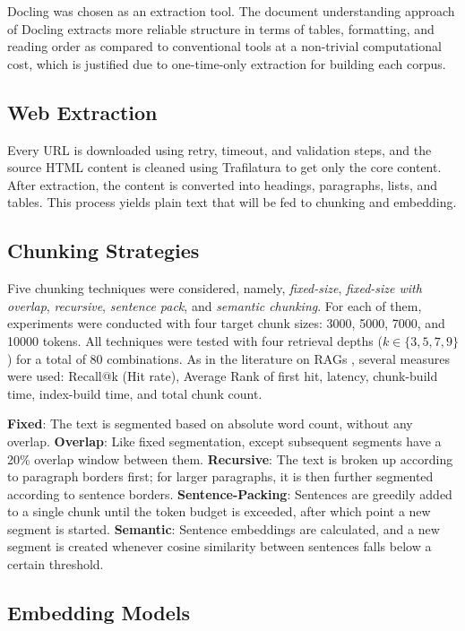 \documentclass[pdflatex,sn-mathphys-num]{sn-jnl}
\theoremstyle{thmstyleone}
\theoremstyle{thmstyletwo}
\theoremstyle{thmstylethree}
\begin{document}
Docling was chosen as an extraction tool. The document understanding approach of Docling extracts more reliable structure in terms of tables, formatting, and reading order as compared to conventional tools at a non-trivial computational cost, which is justified due to one-time-only extraction for building each corpus.

\subsection{Web Extraction}

Every URL is downloaded using retry, timeout, and validation steps, and the source HTML content is cleaned using Trafilatura to get only the core content. After extraction, the content is converted into headings, paragraphs, lists, and tables. This process yields plain text that will be fed to chunking and embedding.

\subsection{Chunking Strategies}

Five chunking techniques were considered, namely, \textit{fixed-size}, \textit{fixed-size with overlap}, \textit{recursive}, \textit{sentence pack}, and \textit{semantic chunking}. For each of them, experiments were conducted with four target chunk sizes: 3000, 5000, 7000, and 10000 tokens. All techniques were tested with four retrieval depths ($k \in \{3, 5, 7, 9\}$) for a total of 80 combinations. As in the literature on RAGs \cite{langchain2023,kamradt2023,gunther2024late}, several measures were used: Recall@k (Hit rate), Average Rank of first hit, latency, chunk-build time, index-build time, and total chunk count.

\textbf{Fixed}: The text is segmented based on absolute word count, without any overlap.
\textbf{Overlap}: Like fixed segmentation, except subsequent segments have a 20\% overlap window between them. \textbf{Recursive}: The text is broken up according to paragraph borders first; for larger paragraphs, it is then further segmented according to sentence borders. \textbf{Sentence-Packing}: Sentences are greedily added to a single
chunk until the token budget is exceeded, after which point a new segment is started. \textbf{Semantic}: Sentence embeddings are calculated, and a new segment is
created whenever cosine similarity between sentences falls below a certain
threshold.

\subsection{Embedding Models}
\end{document}
